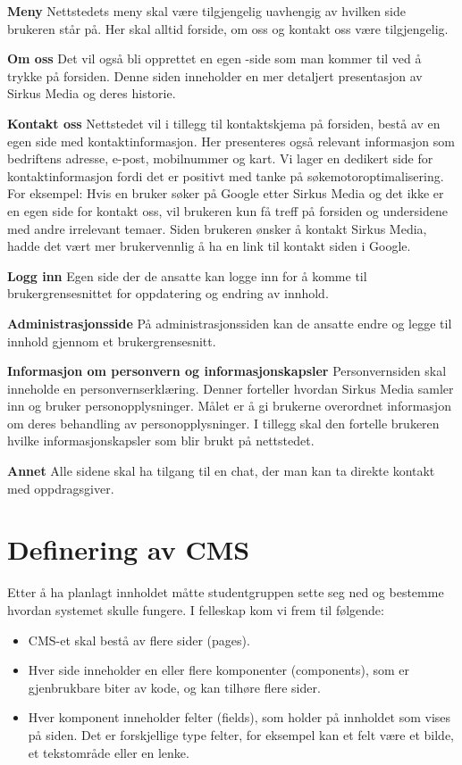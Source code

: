 \textbf{Meny} Nettstedets meny skal være tilgjengelig uavhengig av hvilken side brukeren står på. Her skal alltid forside, om oss og kontakt oss være tilgjengelig. 

\textbf{Om oss} Det vil også bli opprettet en egen -side som man kommer til ved å trykke  på forsiden. Denne siden inneholder en mer detaljert presentasjon av Sirkus Media og deres historie.

\textbf{Kontakt oss} Nettstedet vil i tillegg til kontaktskjema på forsiden, bestå av en egen side med kontaktinformasjon. Her presenteres også relevant informasjon som bedriftens adresse, e-post, mobilnummer og kart. Vi lager en dedikert side for kontaktinformasjon fordi det er positivt med tanke på søkemotoroptimalisering. For eksempel: Hvis en bruker søker på Google etter Sirkus Media og det ikke er en egen side for kontakt oss, vil brukeren kun få treff på forsiden og undersidene med andre irrelevant temaer. Siden brukeren ønsker å kontakt Sirkus Media,  hadde det vært mer brukervennlig å ha en link til kontakt siden i Google.

\textbf{Logg inn} Egen side der de ansatte kan logge inn for å komme til brukergrensesnittet for oppdatering og endring av innhold.

\textbf{Administrasjonsside}  På administrasjonssiden kan de ansatte endre og legge til innhold gjennom et brukergrensesnitt.

\textbf{Informasjon om personvern og informasjonskapsler} Personvernsiden skal inneholde en personvernserklæring. Denner forteller hvordan Sirkus Media samler inn og bruker personopplysninger. Målet er å gi brukerne overordnet informasjon om deres behandling av personopplysninger. I tillegg skal den fortelle brukeren hvilke informasjonskapsler som blir brukt på nettstedet.

\textbf{Annet} Alle sidene skal ha tilgang til en chat, der man kan ta direkte kontakt med oppdragsgiver.

\section{Definering av CMS}
Etter å ha planlagt innholdet måtte studentgruppen sette seg ned og bestemme hvordan systemet skulle fungere. I felleskap kom vi frem til følgende:

\begin{itemize}
\item CMS-et skal bestå av flere sider (pages).
\item Hver side inneholder en eller flere komponenter (components), som er gjenbrukbare biter av kode, og kan tilhøre flere sider.
\item Hver komponent inneholder felter (fields), som holder på innholdet som vises på siden. Det er forskjellige type felter, for eksempel kan et felt være et bilde, et tekstområde eller en lenke. 
\end{itemize}

